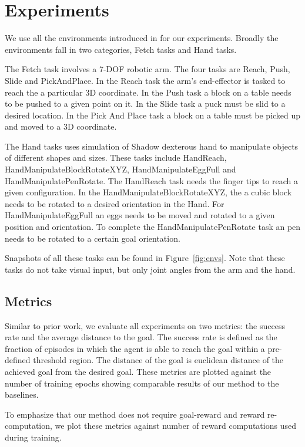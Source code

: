 \section{Experiments}
\label{sec:experiments}
We use all the environments  introduced in \citet{plappert2018multi} for our experiments.
Broadly the environments fall in two categories, Fetch tasks and Hand tasks.

The Fetch task involves a 7-DOF robotic arm. The four tasks are Reach, Push,
Slide and PickAndPlace.
In the Reach task the arm's end-effector is tasked to reach the a particular 3D coordinate. 
In the Push task a block on a table needs to be pushed to a given point on it.
In the Slide task a puck must be slid to a desired location.
In the Pick And Place task a block on a table must be picked up and moved to a
3D coordinate.

The Hand tasks uses simulation of Shadow dexterous hand to manipulate objects of
different shapes and sizes. These tasks include HandReach,
HandManipulateBlockRotateXYZ, HandManipulateEggFull and HandManipulatePenRotate.
The HandReach task needs the finger tips to reach a given configuration.
In the HandManipulateBlockRotateXYZ, the a cubic block needs to be rotated to a
desired orientation in the Hand.
For HandManipulateEggFull an eggs needs to be moved and rotated to a given
position and orientation.
To complete the HandManipulatePenRotate task an pen needs to be rotated to a
certain goal orientation.

Snapshots of all these tasks can be found in Figure~\ref{fig:envs}. Note that
these tasks do not take visual input, but only joint angles from the arm and the hand.


\subsection{Metrics}
Similar to prior work, we evaluate all experiments on two metrics: the success
rate and the average distance to the goal. The success rate is defined as the
fraction of episodes in which the agent is able to reach the goal within a
pre-defined threshold region.
The distance of the goal is euclidean distance of the
achieved goal from the desired goal.
These metrics are plotted against the number of training epochs showing
comparable results of our method to the baselines.

To emphasize that our method does not require goal-reward
and reward re-computation, we plot these metrics against
number of reward computations used during training.

